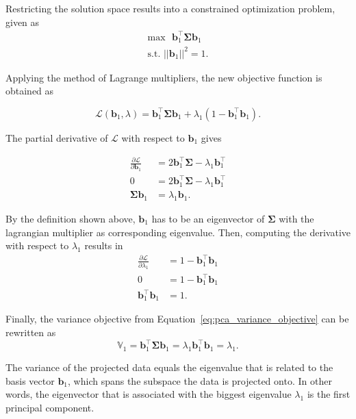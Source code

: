 \documentclass[../../../main.tex]{subfiles}
\begin{document}
Restricting the solution space results into a constrained optimization problem, given as
\begin{align*}
    \mathrm{max} \text{ } \bm{b}_1^\top \bm{\Sigma} \bm{b}_1 \\
    \text{s.t. } || \bm{b}_1 ||^2 = 1.
\end{align*}

Applying the method of Lagrange multipliers, the new objective function is obtained as

\begin{equation*}
    \mathcal{L}(\bm{b}_1, \lambda) = \bm{b}_1^\top \bm{\Sigma} \bm{b}_1 + \lambda_1(1-\bm{b}_1^\top\bm{b}_1).
\end{equation*}

The partial derivative of $\mathcal{L}$ with respect to $\bm{b}_1$ gives

\begin{align*}
    \frac{\partial{\mathcal{L}}}{\partial{\bm{b}_1}} &= 2\bm{b}_1^\top \bm{\Sigma} - \lambda_1 \bm{b}_1^\top \\
    0 &= 2\bm{b}_1^\top \bm{\Sigma} - \lambda_1 \bm{b}_1^\top \\
    \bm{\Sigma} \bm{b}_1 &= \lambda_1 \bm{b}_1.
\end{align*}

By the definition shown above, $\bm{b}_1$ has to be an eigenvector of $\bm{\Sigma}$ with the lagrangian multiplier as corresponding eigenvalue. Then, computing the derivative with respect to $\lambda_1$ results in
\begin{align*}
    \frac{\partial{\mathcal{L}}}{\partial{\lambda_1}} &= 1 - \bm{b}_1^\top\bm{b}_1 \\
    0 &= 1 - \bm{b}_1^\top\bm{b}_1 \\
    \bm{b}_1^\top\bm{b}_1 &= 1.
\end{align*}

Finally, the variance objective from Equation~\ref{eq:pca_variance_objective} can be rewritten as 
\begin{equation}
    \mathbb{V}_1 = \bm{b}_1^\top \bm{\Sigma} \bm{b}_1 = \lambda_1 \bm{b}_1^\top \bm{b}_1 = \lambda_1. 
\end{equation}

The variance of the projected data equals the eigenvalue that is related to the basis vector $\bm{b}_1$, which spans the subspace the data is projected onto. In other words, the eigenvector that is associated with the biggest eigenvalue $\lambda_1$ is the first principal component.
\end{document}

